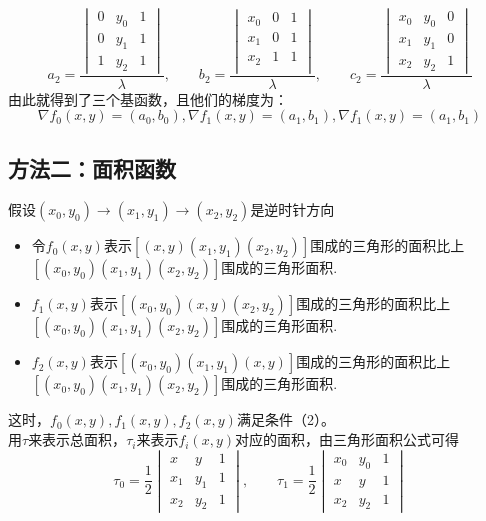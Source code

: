 \documentclass[12pt,a4paper]{article}
\begin{document}
$$
a_2=\frac{\begin{vmatrix}
            0&y_0&1\\
            0&y_1&1\\
            1&y_2&1
          \end{vmatrix}}{\lambda},\qquad
b_2=\frac{\begin{vmatrix}
            x_0&0&1\\
            x_1&0&1\\
            x_2&1&1\\
          \end{vmatrix}}{\lambda},\qquad
c_2=\frac{\begin{vmatrix}
             x_0&y_0&0\\
             x_1&y_1&0\\
             x_2&y_2&1
          \end{vmatrix}}{\lambda}
$$
由此就得到了三个基函数，且他们的梯度为：
$$
\nabla f_0(x,y)=(a_0,b_0),\nabla f_1(x,y)=(a_1,b_1),\nabla f_1(x,y)=(a_1,b_1)
$$
\subsection*{方法二：面积函数}
假设$(x_0,y_0)\rightarrow(x_1,y_1)\rightarrow(x_2,y_2)$是逆时针方向\\
\begin{itemize}
\item 令$f_0(x,y)$表示$[(x,y)(x_1,y_1)(x_2,y_2)]$围成的三角形的面积比上$[(x_0,y_0)(x_1,y_1)(x_2,y_2)]$围成的三角形面积.\\
\item $f_1(x,y)$表示$[(x_0,y_0)(x,y)(x_2,y_2)]$围成的三角形的面积比上$[(x_0,y_0)(x_1,y_1)(x_2,y_2)]$围成的三角形面积.\\
\item $f_2(x,y)$表示$[(x_0,y_0)(x_1,y_1)(x,y)]$围成的三角形的面积比上$[(x_0,y_0)(x_1,y_1)(x_2,y_2)]$围成的三角形面积.\\
\end{itemize}
这时，$f_0(x,y),f_1(x,y),f_2(x,y)$满足条件（2）。\\
用$\tau$来表示总面积，$\tau_i$来表示$f_i(x,y)$对应的面积，由三角形面积公式可得
$$
\tau_0=\frac{1}{2}\begin{vmatrix}
x&y&1\\
x_1&y_1&1\\
x_2&y_2&1
\end{vmatrix},\qquad
\tau_1=\frac{1}{2}\begin{vmatrix}
x_0&y_0&1\\
x&y&1\\
x_2&y_2&1
\end{vmatrix}
$$
\end{document}
